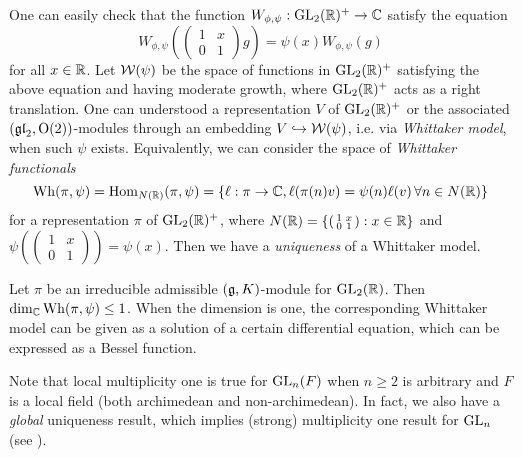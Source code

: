 One can easily check that the function $W_{\phi, \psi}: \mathrm{GL}_2(\mathbb{R})^+ \to \mathbb{C}$ satisfy the equation
$$
   W_{\phi, \psi}\left(\begin{pmatrix}
       1 & x \\ 0 & 1
   \end{pmatrix}g\right) = \psi(x) W_{\phi, \psi}(g)
$$
for all $x \in \mathbb{R}$.
Let $\mathcal{W}(\psi)$ be the space of functions in $\mathrm{GL}_2(\mathbb{R})^+$ satisfying the above equation and having moderate growth, where $\mathrm{GL}_2(\mathbb{R})^+$ acts as a right translation.
One can understood a representation $V$ of $\mathrm{GL}_2(\mathbb{R})^+$ or the associated $(\mathfrak{gl}_2, \mathrm{O}(2))$-modules through an embedding $V \hookrightarrow \mathcal{W}(\psi)$, i.e. via \emph{Whittaker model}, when such $\psi$ exists.
Equivalently, we can consider the space of \emph{Whittaker functionals}
$$
\mathrm{Wh}(\pi, \psi) = \mathrm{Hom}_{N(\mathbb{R})}(\pi, \psi) = \{\ell: \pi \to \mathbb{C}, \ell(\pi(n)v) = \psi(n) \ell(v)\,\forall n \in N(\mathbb{R})\}
$$
for a representation $\pi$ of $\mathrm{GL}_2(\mathbb{R})^+$, where $N(\mathbb{R}) = \{(\begin{smallmatrix}
    1 & x \\ 0 & 1
\end{smallmatrix}): x \in \mathbb{R}\}$ and $\psi((\begin{smallmatrix}
    1 & x \\ 0 & 1
\end{smallmatrix})) = \psi(x)$.
Then we have a \emph{uniqueness} of a Whittaker model.
\begin{theorem}
Let $\pi$ be an irreducible admissible $(\mathfrak{g}, K)$-module for $\mathrm{GL}_2(\mathbb{R})$.
Then $\dim_{\mathbb{C}} \mathrm{Wh}(\pi, \psi) \le 1$.
When the dimension is one, the corresponding Whittaker model can be given as a solution of a certain differential equation, which can be expressed as a Bessel function.
\end{theorem}
Note that local multiplicity one is true for $\mathrm{GL}_n(F)$ when $n \ge 2$ is arbitrary and $F$ is a local field (both archimedean and non-archimedean).
In fact, we also have a \emph{global} uniqueness result, which implies (strong) multiplicity one result for $\mathrm{GL}_n$ (see \cite[Chapter 4]{cogdell2004lectures}).
